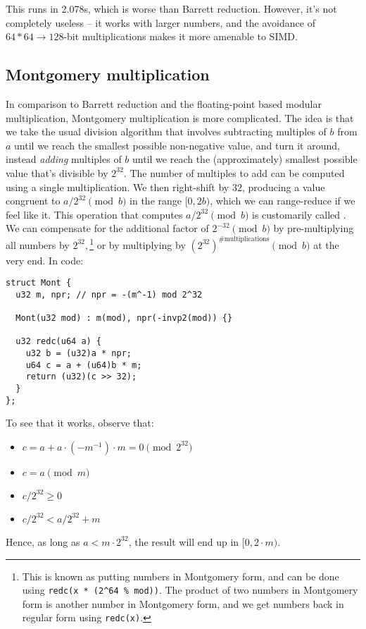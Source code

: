 This runs in 2.078s, which is worse than Barrett reduction.
However, it's not completely useless -- it works with larger numbers, and the avoidance of \mbox{$64*64\rightarrow128$}-bit multiplications makes it more amenable to SIMD.

\subsection{Montgomery multiplication}

In comparison to Barrett reduction and the floating-point based modular multiplication, Montgomery multiplication is more complicated.
The idea is that we take the usual division algorithm that involves subtracting multiples of $b$ from $a$ until we reach the smallest possible non-negative value, and turn it around, instead \emph{adding} multiples of $b$ until we reach the (approximately) smallest possible value that's divisible by $2^{32}$.
The number of multiples to add can be computed using a single multiplication.
We then right-shift by $32$, producing a value congruent to $a / 2^{32} \pmod b$ in the range $[0, 2b)$, which we can range-reduce if we feel like it.
This operation that computes $a / 2^{32} \pmod b$ is customarily called \verb@redc@.
We can compensate for the additional factor of $2^{-32} \pmod b$ by pre-multiplying all numbers by $2^{32},$\footnote{
This is known as putting numbers in Montgomery form, and can be done using \texttt{redc(x * (2\^{}64 \% mod))}.
The product of two numbers in Montgomery form is another number in Montgomery form, and we get numbers back in regular form using \texttt{redc(x)}.
} or by multiplying by $(2^{32})^{\text{\#multiplications}} \pmod b$ at the very end.
In code:

\begin{lstlisting}
struct Mont {
  u32 m, npr; // npr = -(m^-1) mod 2^32

  Mont(u32 mod) : m(mod), npr(-invp2(mod)) {}

  u32 redc(u64 a) {
    u32 b = (u32)a * npr;
    u64 c = a + (u64)b * m;
    return (u32)(c >> 32);
  }
};
\end{lstlisting}

To see that it works, observe that:
\begin{itemize}
  \item $c = a + a \cdot (-m^{-1}) \cdot m = 0 \pmod{2^{32}}$
  \item $c = a \pmod{m}$
  \item $c/2^{32} \ge 0$
  \item $c/2^{32} < a/2^{32} + m$
\end{itemize}
Hence, as long as $a < m\cdot 2^{32}$, the result will end up in $[0, 2\cdot m)$.

